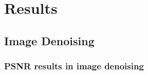 
\chapter{Results} %

\label{Chapter3} %



\section{Image Denoising}
\subsection{PSNR results in image denoising}

